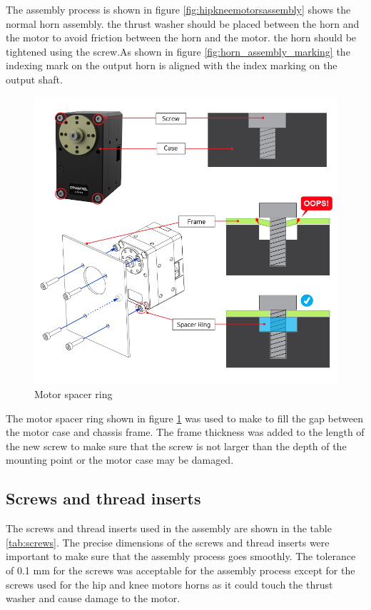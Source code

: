 The assembly process is shown in figure \ref{fig:hipkneemotorsassembly} shows the normal horn assembly. the thrust washer should be placed between the horn and the motor to avoid friction between the horn and the motor. the horn should be tightened using the screw.As shown in figure \ref{fig:horn_assembly_marking} the indexing mark on the output horn is aligned with the index marking on the output shaft.

\begin{figure}[h]
	\centering
	\includegraphics[width=0.5\linewidth]{motor_spacer_ring}
	\caption{Motor spacer ring}
	\label{fig:motorspacerring}
\end{figure}
The motor spacer ring shown in figure \ref{fig:motorspacerring} was used to make to fill the gap between the motor case and chassis frame.
The frame thickness was added to the length of the new screw to make sure that the screw is not larger than the depth of the mounting point or the motor case may be damaged.

\subsection{Screws and thread inserts}
The screws and thread inserts used in the assembly are shown in the table \ref{tab:screws}.
The precise dimensions of the screws and thread inserts were important to make sure that the assembly process goes smoothly.
The tolerance of 0.1 mm for the screws was acceptable for the assembly process except for the screws used for the hip and knee motors horns as it could touch the thrust washer and cause damage to the motor.

